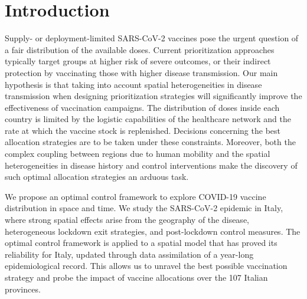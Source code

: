 
\section{Introduction}
Supply- or deployment-limited SARS-CoV-2 vaccines\cite{Khamsi:IfCoronavirusVaccine:2020} pose the urgent question of a fair distribution of the available doses\cite{NationalAcademiesofSciencesEngineeringandMedicine:FrameworkEquitableAllocation:2020}. Current prioritization approaches typically target groups at higher risk of severe outcomes\cite{Spassiani:VaccinationCriteriaBased:2020, Matrajt:VaccineOptimizationCOVID19:2020a}, or their indirect protection by vaccinating those with higher disease transmission\cite{Spassiani:VaccinationCriteriaBased:2020,Gallagher:IndirectBenefitsAre:2021,Tuite:AlternativeDoseAllocation:2021}. Our main hypothesis is that taking into account spatial heterogeneities in disease transmission when designing prioritization strategies will significantly improve the effectiveness of vaccination campaigns.
The distribution of doses inside each country is limited by the logistic capabilities of the healthcare network and the rate at which the vaccine stock is replenished. Decisions concerning the best allocation strategies are to be taken under these constraints. Moreover, both the complex coupling between regions due to human mobility and the spatial heterogeneities in disease history and control interventions make the discovery of such optimal allocation strategies an arduous task.

We propose an optimal control framework to explore COVID-19 vaccine distribution in space and time.
We study the SARS-CoV-2 epidemic in Italy, where strong spatial effects arise from the geography of the disease, heterogeneous lockdown exit strategies, and post-lockdown control measures\cite{Marziano:RetrospectiveAnalysisItalian:2021}. The optimal control framework is applied to a spatial model that has proved its reliability for Italy\cite{Gatto:SpreadDynamicsCOVID19:2020,Bertuzzo:GeographyCOVID19Spread:2020}, updated through data assimilation of a year-long epidemiological record. This allows us to unravel the best possible vaccination strategy and probe the impact of vaccine allocations over the 107 Italian provinces.

